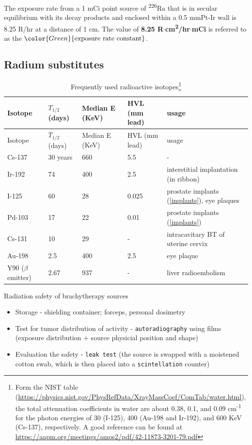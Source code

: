 \documentclass[]{book}
\providecommand{\tightlist}{%
  \setlength{\itemsep}{0pt}\setlength{\parskip}{0pt}}
\let\rmarkdownfootnote\footnote%
\def\footnote{\protect\rmarkdownfootnote}
\theoremstyle{definition}
\theoremstyle{definition}
\theoremstyle{definition}
\theoremstyle{remark}
\begin{document}
The exposure rate from a 1 mCi point source of \textsuperscript{226}Ra
that is in secular equilibrium with its decay products and enclosed
within a 0.5 mmPt-Ir wall is 8.25 R/hr at a distance of 1 cm. The value
of \textbf{8.25 R\(\cdot\)cm\textsuperscript{2}/hr\(\cdot\)mCi} is
referred to as the \(\color{Green}{\text{exposure rate constant}}\).

\subsection{Radium substitutes}\label{radium-substitutes}

\begin{longtable}[]{@{}lllll@{}}
\caption{\label{tab:isotopes} Frequently used radioactive isotopes\footnote{Form
  the NIST table
  (\url{https://physics.nist.gov/PhysRefData/XrayMassCoef/ComTab/water.html}),
  the total attenuation coefficients in water are about 0.38, 0.1, and
  0.09 cm\textsuperscript{-1} for the photon energies of 30 (I-125), 400
  (Au-198 and Ir-192), and 600 KeV (Cs-137), respectively. A good
  reference can be found at
  \url{https://aapm.org/meetings/amos2/pdf/42-11873-3201-79.pdf}}}\tabularnewline
\toprule
Isotope & \(T_{1/2}\) (days) & Median E (KeV) & HVL (mm lead) &
usage\tabularnewline
\midrule
\endfirsthead
\toprule
Isotope & \(T_{1/2}\) (days) & Median E (KeV) & HVL (mm lead) &
usage\tabularnewline
\midrule
\endhead
Cs-137 & 30 years & 660 & 5.5 & -\tabularnewline
Ir-192 & 74 & 400 & 2.5 & interstitial implantation (in
ribbon)\tabularnewline
I-125 & 60 & 28 & 0.025 & prostate implants (\ref{implants}), eye
plaques\tabularnewline
Pd-103 & 17 & 22 & 0.01 & prostate implants
(\ref{implants})\tabularnewline
Cs-131 & 10 & 29 & - & intracavitary BT of uterine cervix\tabularnewline
Au-198 & 2.5 & 400 & 2.5 & eye plaque\tabularnewline
Y90 (\(\beta\) emitter) & 2.67 & 937 & - & liver
radioembolism\tabularnewline
\bottomrule
\end{longtable}

Radiation safety of brachytherapy sources

\begin{itemize}
\tightlist
\item
  Storage - shielding container; forceps, personal dosimetry
\item
  Test for tumor distribution of activity - \texttt{autoradiography}
  using films (exposure distribution + source physicial position and
  shape)
\item
  Evaluation the safety - \texttt{leak\ test} (the source is swapped
  with a moistened cotton swab, which is then placed into a
  \texttt{scintellation} counter)
\end{itemize}
\end{document}
